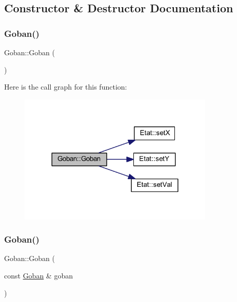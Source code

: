 \subsection{Constructor \& Destructor Documentation}
\mbox{\label{class_goban_a3544d30f54fbb54bd9e4fed08aa4bce6}} 
\subsubsection{\texorpdfstring{Goban()}{Goban()}\hspace{0.1cm}{\footnotesize\ttfamily [1/2]}}
{\footnotesize\ttfamily Goban\+::\+Goban (\begin{DoxyParamCaption}{ }\end{DoxyParamCaption})}

Here is the call graph for this function\+:\nopagebreak
\begin{figure}[H]
\begin{center}
\leavevmode
\includegraphics[width=264pt]{class_goban_a3544d30f54fbb54bd9e4fed08aa4bce6_cgraph}
\end{center}
\end{figure}
\mbox{\label{class_goban_a8c49da36e406f11d33671a4c8a4c19b2}} 
\subsubsection{\texorpdfstring{Goban()}{Goban()}\hspace{0.1cm}{\footnotesize\ttfamily [2/2]}}
{\footnotesize\ttfamily Goban\+::\+Goban (\begin{DoxyParamCaption}\item[{const \hyperlink{class_goban}{Goban} \&}]{goban }\end{DoxyParamCaption})}

